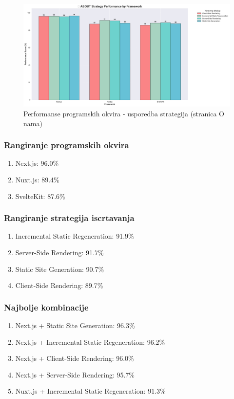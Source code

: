 \begin{figure}[H]
    \centering
    \includegraphics[width=\textwidth]{slike/rezultati/about/about_strategy_comparison.png}
    \caption{Performanse programskih okvira - usporedba strategija (stranica O nama)}
    \label{fig:testiranje-o-nama-usporedba-strategija}
\end{figure}

\newpage

\subsubsection{Rangiranje programskih okvira}
\begin{enumerate}
    \item Next.js: 96.0\%
    \item Nuxt.js: 89.4\%
    \item SvelteKit: 87.6\%
\end{enumerate}

\subsubsection{Rangiranje strategija iscrtavanja}
\begin{enumerate}
    \item Incremental Static Regeneration: 91.9\%
    \item Server-Side Rendering: 91.7\%
    \item Static Site Generation: 90.7\%
    \item Client-Side Rendering: 89.7\%
\end{enumerate}

\subsubsection{Najbolje kombinacije}
\begin{enumerate}
    \item Next.js + Static Site Generation: 96.3\%
    \item Next.js + Incremental Static Regeneration: 96.2\%
    \item Next.js + Client-Side Rendering: 96.0\%
    \item Next.js + Server-Side Rendering: 95.7\%
    \item Nuxt.js + Incremental Static Regeneration: 91.3\%
\end{enumerate}


